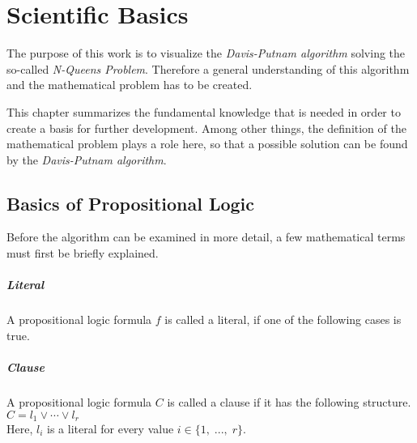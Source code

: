 

\chapter{Scientific Basics}
\label{ch:sciBasics}
The purpose of this work is to visualize the \textit{Davis-Putnam algorithm} solving the so-called \textit{N-Queens Problem}. Therefore a general understanding of this algorithm and the mathematical problem has to be created.

This chapter summarizes the fundamental knowledge that is needed in order to create a basis for further development. Among other things, the definition of the mathematical problem plays a role here, so that a possible solution can be found by the \textit{Davis-Putnam algorithm}.

\section{Basics of Propositional Logic}
\label{sec:sciProLogic}
Before the algorithm can be examined in more detail, a few mathematical terms must first be briefly explained.

\paragraph{Literal}
A propositional logic formula $f$ is called a literal, if one of the following cases is true.

\paragraph{Clause}
A propositional logic formula $C$ is called a clause if it has the following structure.
\\[0.2cm]
\hspace*{1.3cm} $C = l_1 \vee \cdots \vee l_r$ \\[0.2cm] Here, $l_i$ is a literal for every value $i \in \{1,\; ...,\; r\}$.

